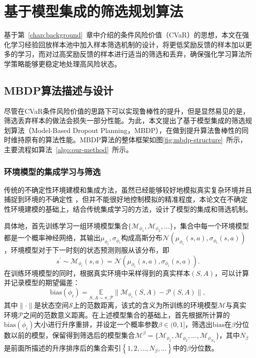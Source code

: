 
\chapter{基于模型集成的筛选规划算法}\label{chap:mbdp}

基于第~\ref{chap:background}~章中介绍的条件风险价值（CVaR）的思想，本文在强化学习经验回放样本池中加入样本筛选机制的设计，将更低奖励反馈的样本加以更多的学习，而对过高奖励反馈的样本进行适当的筛选和丢弃，确保强化学习算法所学策略能够更稳定地处理高风险状态。

\section{MBDP算法描述与设计}

尽管在CVaR条件风险价值的思路下可以实现鲁棒性的提升，但是显然易见的是，筛选丢弃样本的做法会损失一部分性能。为此，本文提出了基于模型集成的筛选规划算法（Model-Based Dropout Planning，MBDP），在做到提升算法鲁棒性的同时维持原有的算法性能。MBDP算法的整体框架如图\ref{fig:mbdp-structure}~所示，主要流程如算法~\ref{algo:our-method}~所示。

\subsection{环境模型的集成学习与筛选}\label{sec:model-method}

传统的不确定性环境建模和集成方法，虽然已经能够较好地模拟真实复杂环境并且捕捉到环境的不确定性 \cite{duan2007multi,zhang2021mbdp}，但并不能很好地控制模拟的精准程度，本论文在不确定性环境建模的基础上，结合传统集成学习的方法，设计了模型的集成和筛选机制。

具体地，首先训练学习一组环境模型集合$\{\mathcal{M}_{\phi_1},\mathcal{M}_{\phi_2},\ldots\}$，集合中每一个环境模型都是一个概率神经网络，其输出$\mu_{\phi_i},\sigma_{\phi_i}$构成高斯分布$\mathcal{N}(\mu_{\phi_i}(s,a),\sigma_{\phi_i}(s,a))$，环境模型对于下一时刻的状态预测则服从该分布，即
\begin{equation}
    s^\prime \sim \mathcal{M}_{\phi_i}(s,a) = \mathcal{N}(\mu_{\phi_i}(s,a),\sigma_{\phi_i}(s,a)).
\end{equation}
在训练环境模型的同时，根据真实环境中采样得到的真实样本$(S,A)$，可以计算并记录模型的期望偏差：
\begin{equation}
    \mathrm{bias}(\phi_i) = \underset{S,A\sim \pi,\mathcal{P}}{\mathbb{E}}\|\mathcal{M}_{\phi_i}(S,A)-\mathcal{P}(S,A)\|,
\end{equation}
其中$\|\cdot\|$是状态空间$\mathcal{S}$上的范数距离，该式的含义为所训练的环境模型$\mathcal{M}$与真实环境$\mathcal{P}$之间的范数意义距离。在上述模型集合的基础上，首先根据所计算的$\mathrm{bias}(\phi_i)$大小进行升序重排，并设定一个概率参数$\beta\in(0,1]$，筛选出$\mathrm{bias}$在$\beta$分位数以前的模型，保留得到筛选后的模型集合$\mathcal{M}^\beta = \{\mathcal{M}_{\phi_1},\mathcal{M}_{\phi_2},\ldots,\mathcal{M}_{\phi_{N_\beta}}\}$，其中$N_\beta$是前面所描述的升序排序后的集合索引$\left\{1,2,\ldots,N_\beta,\ldots\right\}$中的$\beta$分位数。

